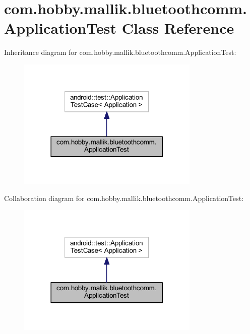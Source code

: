 \hypertarget{classcom_1_1hobby_1_1mallik_1_1bluetoothcomm_1_1_application_test}{}\section{com.\+hobby.\+mallik.\+bluetoothcomm.\+Application\+Test Class Reference}
\label{classcom_1_1hobby_1_1mallik_1_1bluetoothcomm_1_1_application_test}


Inheritance diagram for com.\+hobby.\+mallik.\+bluetoothcomm.\+Application\+Test\+:\nopagebreak
\begin{figure}[H]
\begin{center}
\leavevmode
\includegraphics[width=246pt]{classcom_1_1hobby_1_1mallik_1_1bluetoothcomm_1_1_application_test__inherit__graph}
\end{center}
\end{figure}


Collaboration diagram for com.\+hobby.\+mallik.\+bluetoothcomm.\+Application\+Test\+:\nopagebreak
\begin{figure}[H]
\begin{center}
\leavevmode
\includegraphics[width=246pt]{classcom_1_1hobby_1_1mallik_1_1bluetoothcomm_1_1_application_test__coll__graph}
\end{center}
\end{figure}


